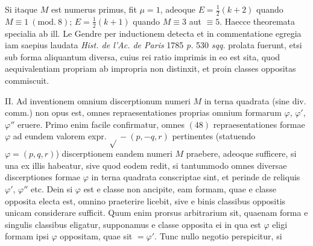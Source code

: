 Si itaque $M$ est numerus primus, fit $\mu=1$, adeoque $E=\tfrac{1}{2}(k+2)$ quando $M\equiv1\ (\mathrm{mod.}\ 8)$; $E=\tfrac{1}{2}(k+1)$ quando $M\equiv3$ aut $\equiv5$. Haecce theoremata specialia ab ill. Le Gendre per inductionem detecta et in commentatione egregia iam saepius laudata \textit{Hist. de l'Ac. de Paris} 1785 \textit{p.} 530 \textit{sqq.} prolata fuerunt, etsi sub forma aliquantum diversa, cuius rei ratio imprimis in eo est sita, quod aequivalentiam propriam ab impropria non distinxit, et proin classes oppositas commiscuit.

II. Ad inventionem omnium discerptionum numeri $M$ in terna quadrata (sine div. comm.) non opus est, omnes repraesentationes proprias omnium formarum $\varphi$, $\varphi'$, $\varphi''$ eruere. Primo enim facile confirmatur, omnes $(48)$ repraesentationes formae $\varphi$ ad eundem valorem expr. $\surd{}-(p,-q,r)$ pertinentes (statuendo $\varphi=(p,q,r)$) discerptionem eandem numeri $M$ praebere, adeoque sufficere, si una ex illis habeatur, sive quod eodem redit, si tantummodo omnes diversae discerptiones formae $\varphi$ in terna quadrata conscriptae sint, et perinde de reliquis $\varphi'$, $\varphi''$ etc. Dein si $\varphi$ est e classe non ancipite, eam formam, quae e classe opposita electa est, omnino praeterire licebit, sive e binis classibus oppositis unicam considerare sufficit. Quum enim prorsus arbitrarium sit, quaenam forma e singulis classibus eligatur, supponamus e classe opposita ei in qua est $\varphi$ eligi formam ipsi $\varphi$ oppositam, quae sit $=\varphi'$. Tunc nullo negotio perspicitur, si
